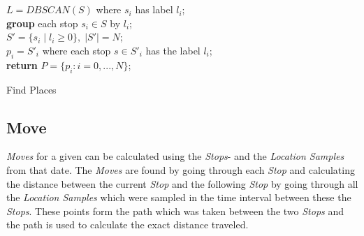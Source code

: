 \begin{algorithm}[H]
\SetAlgoLined
{}\\
\\
    $L = DBSCAN(S)$ where $s_i$ has label $l_i$;\\
    \textbf{group} each stop $s_i \in S$ by $l_i$;\\
    $S' = \{s_i \;|\; l_i \geq 0\}, \;|S'| = N$;\\
    $p_i = S'_i$ where each stop $s \in S'_i$ has the label $l_i$;\\
    \textbf{return} $P = \{p_i : i = 0, ..., N\}$;\\
 \label{algo:places}
 \caption{Find Places}
\end{algorithm}


\subsection{Move}
\textit{Moves} for a given can be calculated using the \textit{Stops}- and the \textit{Location Samples} from that date. The \textit{Moves} are found by going through each \textit{Stop} and calculating the distance between the current \textit{Stop} and the following \textit{Stop} by going through all the \textit{Location Samples} which were sampled in the time interval between these the \textit{Stops}. These points form the path which was taken between the two \textit{Stops} and the path is used to calculate the exact distance traveled.

